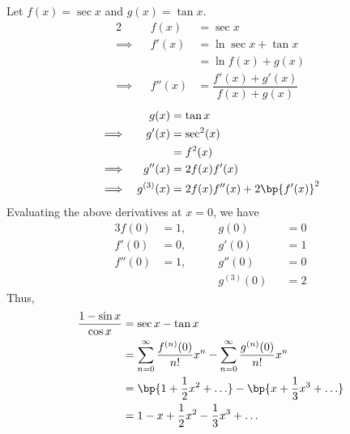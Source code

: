 \documentclass{echw}
\begin{document}
            Let $f(x) = \sec x$ and $g(x) = \tan x$.
            \begin{alignat*}{2}
                &&f(x) &= \sec x\\
                \implies&&f'(x) &= \ln{\sec x + \tan x}\\
                && &= \ln{f(x) + g(x)}\\
                \implies&&f''(x) &= \dfrac{f'(x) + g'(x)}{f(x) + g(x)}
            \end{alignat*}
            \begin{alignat*}{2}
                &&g(x) &= \tan x\\
                \implies&&g'(x) &= \sec^2(x)\\
                && &= f^2(x)\\
                \implies&&g''(x) &= 2f(x)f'(x)\\
                \implies&&g^{(3)}(x) &= 2f(x)f''(x) + 2\bp{f'(x)}^2
            \end{alignat*}
            Evaluating the above derivatives at $x = 0$, we have
            \begin{alignat*}{3}
                f(0) &= 1, \qquad &g(0) &&= 0\\
                f'(0) &= 0, \qquad &g'(0) &&= 1\\
                f''(0) &= 1, \qquad &g''(0) &&= 0\\
                & \qquad &g^{(3)}(0) &&= 2
            \end{alignat*}
            Thus,
            \begin{align*}
                \dfrac{1 - \sin x}{\cos x} &= \sec x - \tan x\\
                &= \sum_{n = 0}^\infty \dfrac{f^{(n)}(0)}{n!}x^n - \sum_{n=0}^\infty \dfrac{g^{(n)}(0)}{n!} x^n\\
                &= \bp{1 + \dfrac12 x^2 + \ldots } - \bp{x + \dfrac13 x^3 + \ldots}\\
                &= 1 - x + \dfrac12 x^2 - \dfrac13 x^3 + \ldots
            \end{align*}

\end{document}
